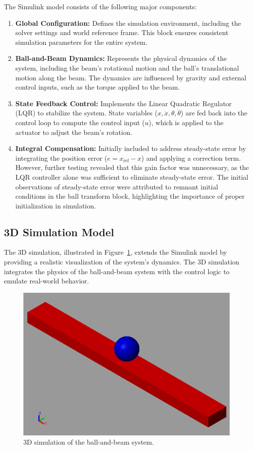 \documentclass[conference]{IEEEtran}
\begin{document}
The Simulink model consists of the following major components:
\begin{enumerate}
    \item \textbf{Global Configuration:}
    Defines the simulation environment, including the solver settings and world reference frame. This block ensures consistent simulation parameters for the entire system.
    \item \textbf{Ball-and-Beam Dynamics:}
    Represents the physical dynamics of the system, including the beam's rotational motion and the ball's translational motion along the beam. The dynamics are influenced by gravity and external control inputs, such as the torque applied to the beam.
    \item \textbf{State Feedback Control:}
    Implements the Linear Quadratic Regulator (LQR) to stabilize the system. State variables (\(x, \dot{x}, \theta, \dot{\theta}\)) are fed back into the control loop to compute the control input (\(u\)), which is applied to the actuator to adjust the beam's rotation.
    \item \textbf{Integral Compensation:}
    Initially included to address steady-state error by integrating the position error (\(e = x_{\text{ref}} - x\)) and applying a correction term. However, further testing revealed that this gain factor was unnecessary, as the LQR controller alone was sufficient to eliminate steady-state error. The initial observations of steady-state error were attributed to remnant initial conditions in the ball transform block, highlighting the importance of proper initialization in simulation.
\end{enumerate}


\subsection{3D Simulation Model}
\label{subsec:3d_simulation}

The 3D simulation, illustrated in Figure~\ref{fig:3d_model}, extends the Simulink model by providing a realistic visualization of the system's dynamics. The 3D simulation integrates the physics of the ball-and-beam system with the control logic to emulate real-world behavior.

\begin{figure}[H]
    \centering
    \includegraphics[width=0.7\linewidth]{figures/3D_Model.png}
    \caption[]{3D simulation of the ball-and-beam system.}
    \label{fig:3d_model}
\end{figure}
\end{document}
